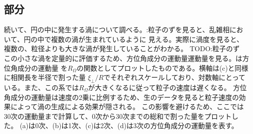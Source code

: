 \documentclass[/Users/ikedahajime/GitHub/reserch/master_report/thesis]{subfiles}
\begin{document}
\subsection{部分}%
続いて、円の中に発生する渦について調べる。:粒子のずを見ると、乱雑相において、円の中で複数の渦が生まれているように
見える。実際に渦度を見ると、複数の、粒径よりも大きな渦が発生していることがわかる。
TODO:粒子のず\\
この小さな渦を定量的に評価するため、方位角成分の運動量運動量を見る。は方位角成分の運動量
を$R_\Omega$の関数としてプロットしたものである。横軸は(c)と同様に相関長を半径で割った量
$\xi_\bot/R$でそれぞれスケールしており、対数軸にとっている。また、この系では$R_\Omega$が大きくなるに従って粒子の速度は遅くなる。
方位角成分の運動量は速度の2乗に比例するため、生のデータを見ると粒子速度の効果によって渦の生成による効果が隠される。
この影響を避けるため、ここでは30次の運動量まで計算して、0次から30次までの総和で割った量をプロットした。
(a)は0次、(b)は1次、(c)は2次、(d)は3次の方位角成分の運動量を表す。
\end{document}
